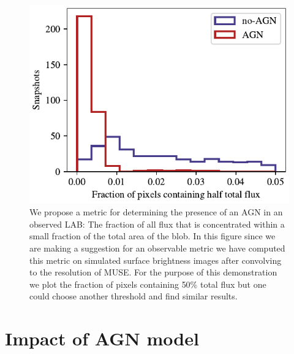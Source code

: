 \begin{figure}
  \centering
    \includegraphics[width=\textwidth,height=\textheight,keepaspectratio]{figures/skew_distribution.pdf}
  \caption{We propose a metric for determining the presence of an AGN in an observed LAB: The fraction of all flux that is concentrated within a small fraction of the total area of the blob. In this figure since we are making a suggestion for an observable metric we have computed this metric on simulated surface brightness images after convolving to the resolution of MUSE. For the purpose of this demonstration we plot the fraction of pixels containing 50\% total flux but one could choose another threshold and find similar results.}
  \label{fig:skewness}
\end{figure}

\section{Impact of AGN model}

